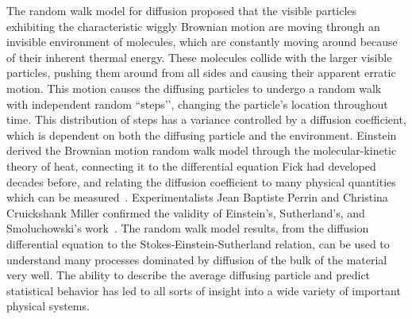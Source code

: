The random walk model for diffusion proposed that the visible particles exhibiting the characteristic wiggly Brownian motion are moving through an invisible environment of molecules, which are constantly moving around because of their inherent thermal energy. These molecules collide with the larger visible particles, pushing them around from all sides and causing their apparent erratic motion. This motion causes the diffusing particles to undergo a random walk with independent random ``steps’’, changing the particle's location throughout time. This distribution of steps has a variance controlled by a diffusion coefficient, which is dependent on both the diffusing particle and the environment. Einstein derived the Brownian motion random walk model through the molecular-kinetic theory of heat, connecting it to the differential equation Fick had developed decades before, and relating the diffusion coefficient to many physical quantities which can be measured~\cite{einstein_uber_1905}. Experimentalists Jean Baptiste Perrin and Christina Cruickshank Miller confirmed the validity of Einstein's, Sutherland's, and Smoluchowski's work~\cite{perrin_mouvement_1909,cruickshank_miller_stokes-einstein_1924}. The random walk model results, from the diffusion differential equation to the Stokes-Einstein-Sutherland relation, can be used to understand many processes dominated by diffusion of the bulk of the material very well. The ability to describe the average diffusing particle and predict statistical behavior has led to all sorts of insight into a wide variety of important physical systems.



